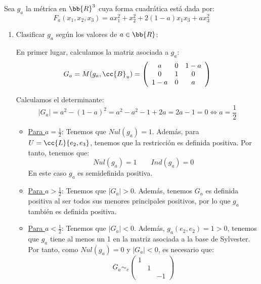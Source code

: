 \documentclass[12pt]{article}
\begin{document}
\begin{ejercicio}
    Sea $g_a$ la métrica en $\bb{R}^3$ cuya forma cuadrática está dada por:
    \begin{equation*}
        F_a(x_1, x_2, x_3) = ax_1^2 + x_2^2 + 2(1 - a)x_1x_3 + ax_3^2
    \end{equation*}

    \begin{enumerate}

        \item Clasificar $g_a$ según los valores de $a\in \bb{R}$:

        En primer lugar, calculamos la matriz asociada a $g_a$:
        \begin{equation*}
            G_a = M(g_a, \cc{B}_u) = \left(\begin{array}{ccc}
                a & 0 & 1-a \\
                0 & 1 & 0 \\
                1-a & 0 & a
            \end{array}\right)
        \end{equation*}

        Calculamos el determinante:
        \begin{equation*}
            |G_a| = a^2 -(1-a)^2 = a^2 -a^2 -1 +2a = 2a-1 = 0\Longleftrightarrow a=\frac{1}{2}
        \end{equation*}
        
        \begin{itemize}
            \item \underline{Para $a=\frac{1}{2}$}: Tenemos que $Nul(g_a)=1$. Además, para $U=\cc{L}\{e_2, e_3\}$, tenemos que la restricción es definida positiva. Por tanto, tenemos que:
            \begin{equation*}
                Nul(g_a)=1 \qquad Ind(g_a)=0
            \end{equation*}
            En este caso $g_a$ es semidefinida positiva.

            \item \underline{Para $a>\frac{1}{2}$}: Tenemos que $|G_a|>0$. Además, tenemos $G_a$ es definida positiva al ser todos sus menores principales positivos, por lo que $g_a$ también es definida positiva.

            \item \underline{Para $a <\frac{1}{2}$}: Tenemos que $|G_a|<0$. Además, $g_a(e_2, e_2)=1>0$, tenemos que $g_a$ tiene al menos un 1 en la matriz asociada a la base de Sylvester. Por tanto, como $Nul(g_a)=0$ y $|G_a|<0$, es necesario que:
            \begin{equation*}
                G_a\sim_c \left(\begin{array}{ccc}
                    1 &  \\
                     & 1 &  \\
                    &  & -1
                \end{array}\right)
            \end{equation*}


\end{itemize}
\end{enumerate}
\end{ejercicio}
\end{document}

